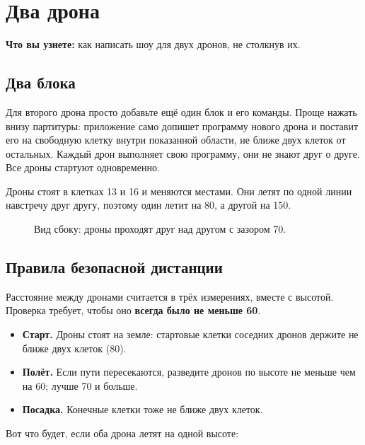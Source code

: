 \chapter{Два дрона}\label{ch:dva-drona}

\textbf{Что вы узнете:} как написать шоу для двух дронов, не столкнув их.

\section{Два блока}

Для второго дрона просто добавьте ещё один блок  и его команды. Проще нажать  внизу партитуры: приложение само допишет программу нового дрона и поставит его на свободную клетку внутри показанной области, не ближе двух клеток от остальных. Каждый дрон выполняет свою программу, они не знают друг о друге. Все дроны стартуют одновременно.


Дроны стоят в клетках 13 и 16 и меняются местами. Они летят по одной линии навстречу друг другу, поэтому один летит на 80\cm, а другой на 150\cm.

\begin{figure}[H]
  \centering
  
  \caption{Вид сбоку: дроны проходят друг над другом с зазором 70\cm.}\label{fig:heights}
\end{figure}

\section{Правила безопасной дистанции}

Расстояние между дронами считается в трёх измерениях, вместе с высотой. Проверка требует, чтобы оно \textbf{всегда было не меньше 60\cm}.

\begin{itemize}
  \item \textbf{Старт.} Дроны стоят на земле: стартовые клетки соседних дронов держите не ближе двух клеток (80\cm).
  \item \textbf{Полёт.} Если пути пересекаются, разведите дронов по высоте не меньше чем на 60\cm; лучше 70 и больше.
  \item \textbf{Посадка.} Конечные клетки тоже не ближе двух клеток.
\end{itemize}

Вот что будет, если оба дрона летят на одной высоте:

